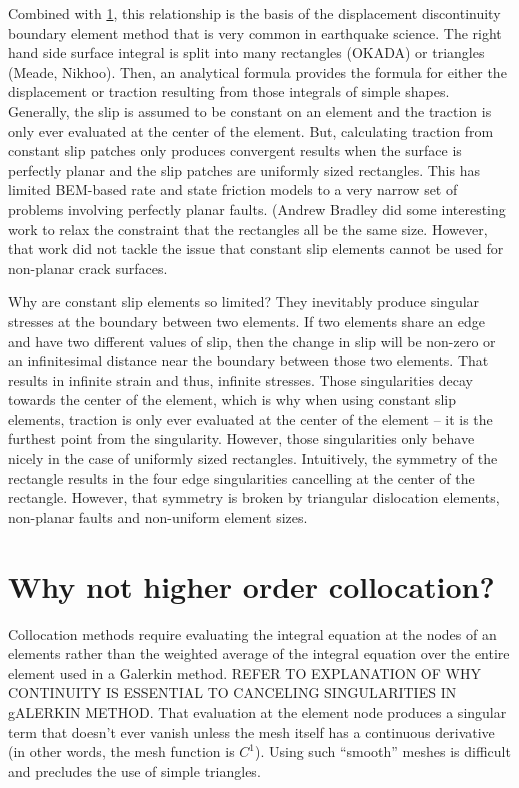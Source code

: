 \documentclass{article}
\begin{document}
{Combined with \ref{}, this relationship is the basis of the displacement discontinuity boundary element method that is very common in earthquake science. The right hand side surface integral is split into many rectangles (OKADA) or triangles (Meade, Nikhoo). Then, an analytical formula provides the formula for either the displacement or traction resulting from those integrals of simple shapes. Generally, the slip is assumed to be constant on an element and the traction is only ever evaluated at the center of the element. But, calculating traction from constant slip patches only produces convergent results when the surface is perfectly planar and the slip patches are uniformly sized rectangles. This has limited BEM-based rate and state friction models to a very narrow set of problems involving perfectly planar faults. (Andrew Bradley did some interesting work to relax the constraint that the rectangles all be the same size. However, that work did not tackle the issue that constant slip elements cannot be used for non-planar crack surfaces. 

Why are constant slip elements so limited? They inevitably produce singular stresses at the boundary between two elements. If two elements share an edge and have two different values of slip, then the change in slip will be non-zero or an infinitesimal distance near the boundary between those two elements. That results in infinite strain and thus, infinite stresses. Those singularities decay towards the center of the element, which is why when using constant slip elements, traction is only ever evaluated at the center of the element -- it is the furthest point from the singularity. However, those singularities only behave nicely in the case of uniformly sized rectangles. Intuitively, the symmetry of the rectangle results in the four edge singularities cancelling at the center of the rectangle. However, that symmetry is broken by triangular dislocation elements, non-planar faults and non-uniform element sizes.

\section{Why not higher order collocation?}

Collocation methods require evaluating the integral equation at the nodes of an elements rather than the weighted average of the integral equation over the entire element used in a Galerkin method. REFER TO EXPLANATION OF WHY CONTINUITY IS ESSENTIAL TO CANCELING SINGULARITIES IN gALERKIN METHOD. That evaluation at the element node produces a singular term that doesn't ever vanish unless the mesh itself has a continuous derivative (in other words, the mesh function is $C^1$). Using such ``smooth'' meshes is difficult and precludes the use of simple triangles.

}
\end{document}
